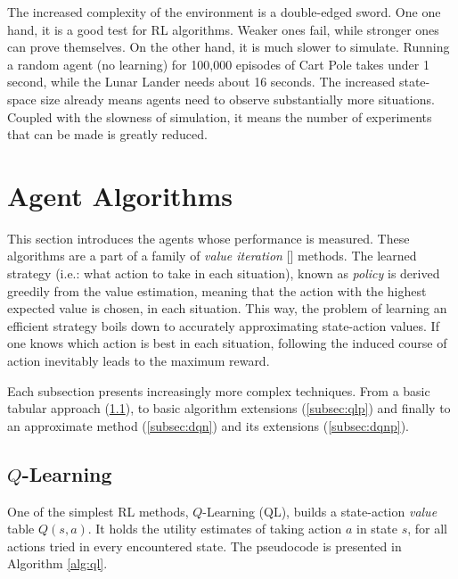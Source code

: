 \documentclass{article}
\begin{document}
The increased complexity of the environment is a double-edged sword. One one hand, it is a good test for RL algorithms. Weaker ones fail, while stronger ones can prove themselves. On the other hand, it is much slower to simulate. Running a random agent (no learning) for 100,000 episodes of Cart Pole takes under 1 second, while the Lunar Lander needs about 16 seconds. The increased state-space size already means agents need to observe substantially more situations. Coupled with the slowness of simulation, it means the number of experiments that can be made is greatly reduced.


\newpage
\section{Agent Algorithms}
\label{sec:agents}

This section introduces the agents whose performance is measured. These algorithms are a part of a family of \textit{value iteration} [\cite{sutton}] methods. The learned strategy (i.e.: what action to take in each situation), known as \textit{policy} is derived greedily from the value estimation, meaning that the action with the highest expected value is chosen, in each situation. This way, the problem of learning an efficient strategy boils down to accurately approximating state-action values. If one knows which action is best in each situation, following the induced course of action inevitably leads to the maximum reward.

Each subsection presents increasingly more complex techniques. From a basic tabular approach (\ref{subsec:ql}), to basic algorithm extensions (\ref{subsec:qlp}) and finally to an approximate method (\ref{subsec:dqn}) and its extensions (\ref{subsec:dqnp}).

\subsection{$Q$-Learning}
\label{subsec:ql}

One of the simplest RL methods, $Q$-Learning (QL), builds a state-action \textit{value} table $Q(s, a)$. It holds the utility estimates of taking action $a$ in state $s$, for all actions tried in every encountered state. The pseudocode is presented in Algorithm \ref{alg:ql}. 
\end{document}
